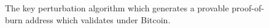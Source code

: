 \begin{figure}[t]
\begin{algorithm}[H]
    \caption{\label{alg.construction-real} The key perturbation algorithm which generates a provable proof-of-burn address which validates under Bitcoin.}
    \begin{algorithmic}[1]
            \Let{\checksum}{\SHA(\SHA(\addr))[4 * 8]}
            \State\Return{\baseencode($\addr \conc \checksum$)}
        \EndFunction
        \vskip8pt
    \end{algorithmic}
\end{algorithm}
\end{figure}
